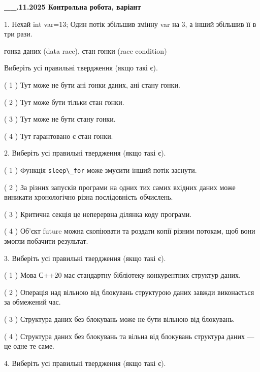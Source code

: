 \documentclass[12pt, ukrainian]{article}
\def\code#1{\Verb!#1!}
\begin{document}
\newpage
\begin {large}

\textbf{\_\_.11.2025 Контрольна робота, варіант  }\par


{
1. Нехай int var=13; Один потік збільшив змінну var на 3, а інший збільшив її в три рази.

гонка даних (data race), стан гонки (race condition)

Виберіть усі правильні твердження (якщо такі є).\par
\vspace{2mm}
( 1 ) Тут може не бути ані гонки даних, ані стану гонки.%

( 2 ) Тут може бути тільки стан гонки.%

( 3 ) Тут може не бути стану гонки.%

( 4 ) Тут гарантовано є стан гонки.%


2. Виберіть усі правильні твердження (якщо такі є).\par
\vspace{2mm}

( 1 ) Функція \code{sleep\_for} може змусити інший потік заснути.%

( 2 ) За різних запусків програми на одних тих самих вхідних даних може виникати хронологічно різна послідовність обчислень.%

( 3 ) Критична секція це неперервна ділянка коду програми.%

( 4 ) Об’єкт future можна скопіювати та роздати копії різним потокам, щоб вони змогли побачити результат.%


3. Виберіть усі правильні твердження (якщо такі є).\par
\vspace{2mm}

( 1 ) Мова С++20 має стандартну бібліотеку конкурентних структур даних.%

( 2 ) Операція над вільною від блокувань структурою даних завжди виконається за обмежений час.%

( 3 ) Структура даних без блокувань може не бути вільною від блокувань.%

( 4 ) Структура даних без блокувань та вільна від блокувань структура даних --- це одне те саме.%


4. Виберіть усі правильні твердження (якщо такі є).\par
\vspace{2mm}

}
\end{large}
\end{document}

